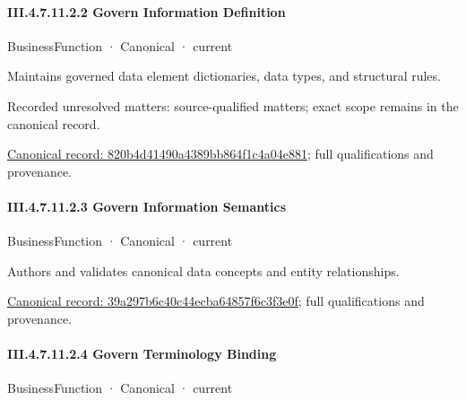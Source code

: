 \paragraph*{III.4.7.11.2.2 Govern Information Definition}
\label{navigation:III.4.7.11.2.2}

\label{element:820b4d41490a4389bb864f1c4a04e881}
{\small BusinessFunction · Canonical · current}\par

Maintains governed data element dictionaries, data types, and structural rules.


{\small Recorded unresolved matters: source-qualified matters; exact scope remains in the canonical record.}\par
{\footnotesize \href{../../../../continuum/business/business-function/820b4d41490a4389bb864f1c4a04e881.md}{Canonical record: 820b4d41490a4389bb864f1c4a04e881}; full qualifications and provenance.}\par
\paragraph*{III.4.7.11.2.3 Govern Information Semantics}
\label{navigation:III.4.7.11.2.3}

\label{element:39a297b6c40c44ecba64857f6c3f3e0f}
{\small BusinessFunction · Canonical · current}\par

Authors and validates canonical data concepts and entity relationships.


{\footnotesize \href{../../../../continuum/business/business-function/39a297b6c40c44ecba64857f6c3f3e0f.md}{Canonical record: 39a297b6c40c44ecba64857f6c3f3e0f}; full qualifications and provenance.}\par
\paragraph*{III.4.7.11.2.4 Govern Terminology Binding}
\label{navigation:III.4.7.11.2.4}

\label{element:9e96ce12b7494594a6129f79f7491223}
{\small BusinessFunction · Canonical · current}\par


